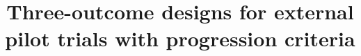 \documentclass{bmcart}
\begin{document}
\begin{frontmatter}

\begin{fmbox}


\title{Three-outcome designs for external pilot trials with progression criteria}


\author[
   addressref={aff1},                   %
   email={d.t.wilson@leeds.ac.uk}   %
]{ }
\author[
   addressref={aff1},
   email={E.Hudson1@leeds.ac.uk}
]{ }
\author[
   addressref={aff1},
   email={S.Brown@leeds.ac.uk}
]{ }
\author[
   addressref={aff1},
   email={M.Collinson@leeds.ac.uk}
]{ }


\address[id=aff1]{%
  , %
  ,                              %
}


\end{fmbox}
\end{frontmatter}
\end{document}
